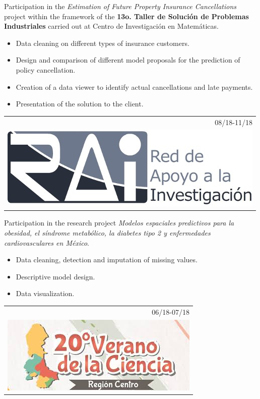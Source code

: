 \documentclass[]{friggeri-cv}
\begin{document}
\begin{entrylist}
{\begin{tabular}{r}
	\end{tabular}
    }
    {\vspace{-0.91cm}}
    { }
    {Participation in the \textsl{Estimation of Future Property Insurance Cancellations} project within the framework of the \textbf{13o. Taller de Solución de Problemas Industriales} carried out at Centro de Investigación en Matemáticas.
    \begin{itemize}
	\item Data cleaning on different types of insurance customers.
	\item Design and comparison of different model proposals for the prediction of policy cancellation.
	\item Creation of a data viewer to identify actual cancellations and late payments.
	\item Presentation of the solution to the client.
    \end{itemize}}
\entry
   {   \begin{tabular}{r}
    		08/18-11/18\\
     		\includegraphics[scale=0.15]{img/RAI.jpg}
	\end{tabular}
    }
    {\vspace{-0.95cm}}
    { }
    {Participation in the research project \textsl{Modelos espaciales predictivos para la obesidad, el síndrome metabólico, la diabetes tipo 2 y enfermedades cardiovasculares en México}.
    \begin{itemize}
	\item Data cleaning, detection and imputation of missing values.
	\item Descriptive model design.
	\item Data visualization.
\end{itemize}}
  \entry
    {\begin{tabular}{r}
    		06/18-07/18\\
     		\includegraphics[scale=0.203]{img/20verano.jpeg}

\end{tabular}}
\end{entrylist}
\end{document}
